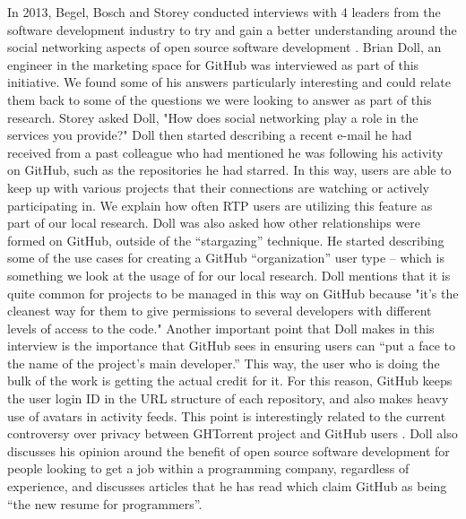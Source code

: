 In 2013, Begel, Bosch and Storey conducted interviews with 4 leaders from the software development industry to try and gain a better understanding around the social networking aspects of open source software development \cite{begel_social_2013}. Brian Doll, an engineer in the marketing space for GitHub was interviewed as part of this initiative. We found some of his answers particularly interesting and could relate them back to some of the questions we were looking to answer as part of this research. Storey asked Doll, "How does social networking play a role in the services you provide?" Doll then started describing a recent e-mail he had received from a past colleague who had mentioned he was following his activity on GitHub, such as the repositories he had starred. In this way, users are able to keep up with various projects that their connections are watching or actively participating in. We explain how often RTP users are utilizing this feature as part of our local research. Doll was also asked how other relationships were formed on GitHub, outside of the “stargazing” technique. He started describing some of the use cases for creating a GitHub “organization” user type – which is something we look at the usage of for our local research. Doll mentions that it is quite common for projects to be managed in this way on GitHub because "it's the cleanest way for them to give permissions to several developers with different levels of access to the code." Another important point that Doll makes in this interview is the importance that GitHub sees in ensuring users can “put a face to the name of the project's main developer.” This way, the user who is doing the bulk of the work is getting the actual credit for it. For this reason, GitHub keeps the user login ID in the URL structure of each repository, and also makes heavy use of avatars in activity feeds. This point is interestingly related to the current controversy over privacy between GHTorrent project and GitHub users \cite{_issue_????}. Doll also discusses his opinion around the benefit of open source software development for people looking to get a job within a programming company, regardless of experience, and discusses articles that he has read which claim GitHub as being “the new resume for programmers”. 
